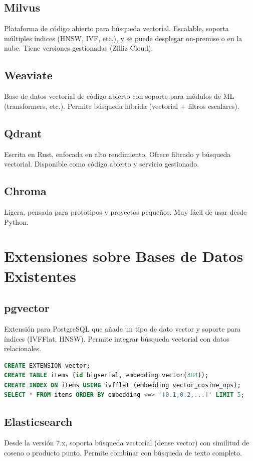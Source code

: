 \documentclass[12pt,a4paper,openany,oneside]{book}
\begin{document}
\subsection{Milvus}
Plataforma de código abierto para búsqueda vectorial. Escalable, soporta múltiples índices (HNSW, IVF, etc.), y se puede desplegar on-premise o en la nube. Tiene versiones gestionadas (Zilliz Cloud).

\subsection{Weaviate}
Base de datos vectorial de código abierto con soporte para módulos de ML (transformers, etc.). Permite búsqueda híbrida (vectorial + filtros escalares).

\subsection{Qdrant}
Escrita en Rust, enfocada en alto rendimiento. Ofrece filtrado y búsqueda vectorial. Disponible como código abierto y servicio gestionado.

\subsection{Chroma}
Ligera, pensada para prototipos y proyectos pequeños. Muy fácil de usar desde Python.

\section{Extensiones sobre Bases de Datos Existentes}
\subsection{pgvector}
Extensión para PostgreSQL que añade un tipo de dato vector y soporte para índices (IVFFlat, HNSW). Permite integrar búsqueda vectorial con datos relacionales.
\begin{lstlisting}[language=SQL]
CREATE EXTENSION vector;
CREATE TABLE items (id bigserial, embedding vector(384));
CREATE INDEX ON items USING ivfflat (embedding vector_cosine_ops);
SELECT * FROM items ORDER BY embedding <=> '[0.1,0.2,...]' LIMIT 5;
\end{lstlisting}

\subsection{Elasticsearch}
Desde la versión 7.x, soporta búsqueda vectorial (dense vector) con similitud de coseno o producto punto. Permite combinar con búsqueda de texto completo.
\end{document}

